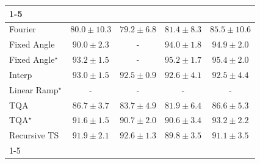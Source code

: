 \begin{tabular}{l|cccc|}
\cline{1-5}
\multicolumn{5}{c}{\rule{0pt}{8pt}SV} \\
\midrule
Fourier & {\cellcolor[HTML]{73A9CF}} \color[HTML]{F1F1F1} $80.0\pm 10.3$ & {\cellcolor[HTML]{7EADD1}} \color[HTML]{F1F1F1} $79.2\pm 6.8$ & {\cellcolor[HTML]{5C9FC9}} \color[HTML]{F1F1F1} $81.4\pm 8.3$ & {\cellcolor[HTML]{2182B9}} \color[HTML]{F1F1F1} $85.5\pm 10.6$ \\
Fixed Angle & {\cellcolor[HTML]{04629A}} \color[HTML]{F1F1F1} $90.0\pm 2.3$ & {\cellcolor[HTML]{000000}} \color[HTML]{F1F1F1} {\cellcolor{white}} \color{black} - & {\cellcolor[HTML]{03446A}} \color[HTML]{F1F1F1} $94.0\pm 1.8$ & {\cellcolor[HTML]{023C5F}} \color[HTML]{F1F1F1} $94.9\pm 2.0$ \\
Fixed Angle$^\star$ & {\cellcolor[HTML]{034B76}} \color[HTML]{F1F1F1} $93.2\pm 1.5$ & {\cellcolor[HTML]{000000}} \color[HTML]{F1F1F1} {\cellcolor{white}} \color{black} - & {\cellcolor[HTML]{02395A}} \color[HTML]{F1F1F1} $95.2\pm 1.7$ & {\cellcolor[HTML]{023858}} \color[HTML]{F1F1F1} $95.4\pm 2.0$ \\
Interp & {\cellcolor[HTML]{034C78}} \color[HTML]{F1F1F1} $93.0\pm 1.5$ & {\cellcolor[HTML]{045280}} \color[HTML]{F1F1F1} $92.5\pm 0.9$ & {\cellcolor[HTML]{03517E}} \color[HTML]{F1F1F1} $92.6\pm 4.1$ & {\cellcolor[HTML]{045280}} \color[HTML]{F1F1F1} $92.5\pm 4.4$ \\
Linear Ramp$^\star$ & {\cellcolor[HTML]{000000}} \color[HTML]{F1F1F1} {\cellcolor{white}} \color{black} - & {\cellcolor[HTML]{000000}} \color[HTML]{F1F1F1} {\cellcolor{white}} \color{black} - & {\cellcolor[HTML]{000000}} \color[HTML]{F1F1F1} {\cellcolor{white}} \color{black} - & {\cellcolor[HTML]{000000}} \color[HTML]{F1F1F1} {\cellcolor{white}} \color{black} - \\
TQA & {\cellcolor[HTML]{1278B4}} \color[HTML]{F1F1F1} $86.7\pm 3.7$ & {\cellcolor[HTML]{3790C0}} \color[HTML]{F1F1F1} $83.7\pm 4.9$ & {\cellcolor[HTML]{549CC7}} \color[HTML]{F1F1F1} $81.9\pm 6.4$ & {\cellcolor[HTML]{1278B4}} \color[HTML]{F1F1F1} $86.6\pm 5.3$ \\
TQA$^\star$ & {\cellcolor[HTML]{04598C}} \color[HTML]{F1F1F1} $91.6\pm 1.5$ & {\cellcolor[HTML]{045E94}} \color[HTML]{F1F1F1} $90.7\pm 2.0$ & {\cellcolor[HTML]{045F95}} \color[HTML]{F1F1F1} $90.6\pm 3.4$ & {\cellcolor[HTML]{034B76}} \color[HTML]{F1F1F1} $93.2\pm 2.2$ \\
Recursive TS & {\cellcolor[HTML]{045687}} \color[HTML]{F1F1F1} $91.9\pm 2.1$ & {\cellcolor[HTML]{03517E}} \color[HTML]{F1F1F1} $92.6\pm 1.3$ & {\cellcolor[HTML]{04649D}} \color[HTML]{F1F1F1} $89.8\pm 3.5$ & {\cellcolor[HTML]{045C90}} \color[HTML]{F1F1F1} $91.1\pm 3.5$ \\
\cline{1-5}
\bottomrule
\end{tabular}
